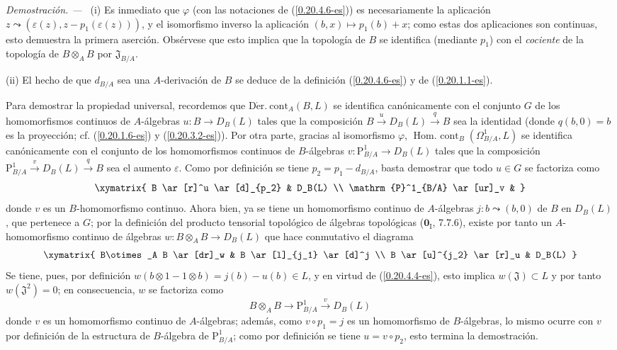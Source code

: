 \documentclass[10pt,oneside]{book}
\newcommand{\sref}[1]{\textup{(\ref{#1})}}
\newcommand{\oldpage}[2][]{%
  \setcounter{footnote}{0}%
  \marginpar{\scriptsize\textbf{#1}~|~#2}\ignorespaces}
\newenvironment{proof}{%
  \par\medskip\noindent\textit{Demostración. ---\ }}{\par}
\providecommand{\setmin}{-}%
\begin{document}
\begin{proof}
\oldpage[0\textsubscript{IV-1}]{126}
(i) Es inmediato que $\varphi$ (con las notaciones de
\sref{0.20.4.6-es}) es necesariamente la aplicación
$z\leadsto(\varepsilon(z),z\setmin p_1(\varepsilon(z)))$, y el isomorfismo
inverso la aplicación $(b,x)\mapsto p_1(b)+x$; como estas dos aplicaciones
son continuas, esto demuestra la primera aserción. Obsérvese que esto
implica que la topología de $B$ se identifica (mediante $p_1$) con el \emph{cociente}
de la topología de $B\otimes_A B$ por $\mathfrak{J}_{B/A}$.

(ii) El hecho de que $d_{B/A}$ sea una $A$-derivación de $B$ se deduce de la
definición \sref{0.20.4.6-es} y de \sref{0.20.1.1-es}.

Para demostrar la propiedad universal, recordemos que
$\operatorname{D\acute{e}r.\ cont}_A(B,L)$ se identifica canónicamente con
el conjunto $G$ de los homomorfismos continuos de $A$-álgebras
$u:B\to D_B(L)$ tales que la composición
$B\xrightarrow{u}D_B(L)\xrightarrow{q}B$ sea la identidad (donde $q(b,0)=b$ es
la proyección; cf. \sref{0.20.1.6-es} y \sref{0.20.3.2-es}). Por otra parte,
gracias al isomorfismo $\varphi$,
$\operatorname{Hom.\ cont}_B(\Omega^1_{B/A},L)$ se identifica canónicamente con
el conjunto de los homomorfismos continuos de $B$-álgebras
$v:\mathrm{P}^1_{B/A}\to D_B(L)$ tales que la composición
$\mathrm{P}^1_{B/A}\xrightarrow{v}D_B(L)\xrightarrow{q}B$ sea
el aumento $\varepsilon$. Como por definición se tiene $p_2=p_1\setmin d_{B/A}$,
basta demostrar que todo $u\in G$ se factoriza como
\[
\xymatrix{
  B \ar[r]^u \ar[d]_{p_2} & D_B(L) \\
  \mathrm{P}^1_{B/A} \ar[ur]_v &
}
\]
donde $v$ es un $B$-homomorfismo continuo. Ahora bien, ya se tiene un homomorfismo
continuo de $A$-álgebras $j:b\leadsto(b,0)$ de $B$ en $D_B(L)$, que
pertenece a $G$; por la definición del producto tensorial topológico
de álgebras topológicas ($\mathbf 0_{\mathrm I}$, 7.7.6), existe por tanto un
$A$-homomorfismo continuo de álgebras
$w:B\otimes_A B\to D_B(L)$ que hace conmutativo el diagrama
\[
\xymatrix{
  B\otimes_A B \ar[dr]_w & B \ar[l]_{j_1} \ar[d]^j \\
  B \ar[u]^{j_2} \ar[r]_u & D_B(L)
}
\]
Se tiene, pues, por definición
$w(b\otimes1\setmin 1\otimes b)=j(b)\setmin u(b)\in L$, y en virtud de
\sref{0.20.4.4-es}, esto implica $w(\mathfrak{J})\subset L$ y por tanto
$w(\mathfrak{J}^2)=0$; en consecuencia, $w$ se factoriza como
\[
  B\otimes_A B\to\mathrm{P}^1_{B/A}\xrightarrow{v}D_B(L)
\]
donde $v$ es un homomorfismo continuo de $A$-álgebras; además, como
$v\circ p_1=j$ es un homomorfismo de $B$-álgebras, lo mismo ocurre con
$v$ por definición de la estructura de $B$-álgebra de
$\mathrm{P}^1_{B/A}$; como por definición se tiene $u=v\circ p_2$, esto
termina la demostración.
\end{proof}
\end{document}
